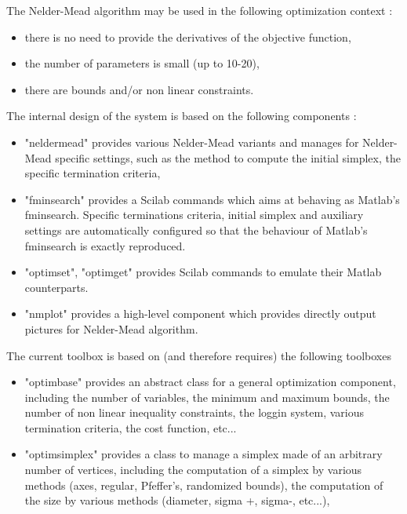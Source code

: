 The Nelder-Mead algorithm may be used in the following optimization context :
\begin{itemize}
\item there is no need to provide the derivatives of the objective function,
\item the number of parameters is small (up to 10-20),
\item there are bounds and/or non linear constraints.
\end{itemize}

The internal design of the system is based on the following components :
\begin{itemize}
\item "neldermead" provides various Nelder-Mead variants and manages for Nelder-Mead specific settings, such as the method to compute the initial simplex, the specific termination criteria,
\item "fminsearch" provides a Scilab commands which aims at behaving as Matlab's fminsearch. Specific terminations criteria, initial simplex and auxiliary settings are automatically configured so that the behaviour of Matlab's fminsearch is exactly reproduced.
\item "optimset", "optimget" provides Scilab commands to emulate their Matlab counterparts.
\item "nmplot" provides a high-level component which provides directly output pictures for Nelder-Mead algorithm.
\end{itemize}
The current toolbox is based on (and therefore requires) the following toolboxes 
\begin{itemize}
\item "optimbase" provides an abstract class for a general optimization component, including the number of variables, the minimum and maximum bounds, the number of non linear inequality constraints, the loggin system, various termination criteria, the cost function, etc...
\item "optimsimplex" provides a class to manage a simplex made of an arbitrary number of vertices, including the computation of a simplex by various methods (axes, regular, Pfeffer's, randomized bounds), the computation of the size by various methods (diameter, sigma +, sigma-, etc...),
\end{itemize}

